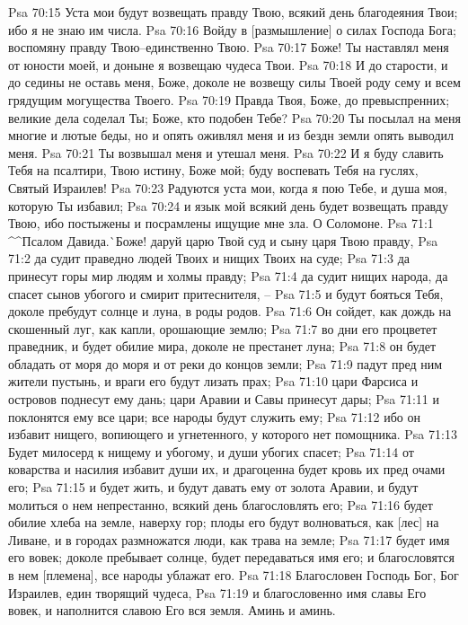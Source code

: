 Psa 70:15  Уста мои будут возвещать правду Твою, всякий день благодеяния Твои; ибо я не знаю им числа.
Psa 70:16  Войду в [размышление] о силах Господа Бога; воспомяну правду Твою--единственно Твою.
Psa 70:17  Боже! Ты наставлял меня от юности моей, и доныне я возвещаю чудеса Твои.
Psa 70:18  И до старости, и до седины не оставь меня, Боже, доколе не возвещу силы Твоей роду сему и всем грядущим могущества Твоего.
Psa 70:19  Правда Твоя, Боже, до превыспренних; великие дела соделал Ты; Боже, кто подобен Тебе?
Psa 70:20  Ты посылал на меня многие и лютые беды, но и опять оживлял меня и из бездн земли опять выводил меня.
Psa 70:21  Ты возвышал меня и утешал меня.
Psa 70:22  И я буду славить Тебя на псалтири, Твою истину, Боже мой; буду воспевать Тебя на гуслях, Святый Израилев!
Psa 70:23  Радуются уста мои, когда я пою Тебе, и душа моя, которую Ты избавил;
Psa 70:24  и язык мой всякий день будет возвещать правду Твою, ибо постыжены и посрамлены ищущие мне зла. О Соломоне.
Psa 71:1  ^^Псалом Давида.^^ Боже! даруй царю Твой суд и сыну царя Твою правду,
Psa 71:2  да судит праведно людей Твоих и нищих Твоих на суде;
Psa 71:3  да принесут горы мир людям и холмы правду;
Psa 71:4  да судит нищих народа, да спасет сынов убогого и смирит притеснителя, --
Psa 71:5  и будут бояться Тебя, доколе пребудут солнце и луна, в роды родов.
Psa 71:6  Он сойдет, как дождь на скошенный луг, как капли, орошающие землю;
Psa 71:7  во дни его процветет праведник, и будет обилие мира, доколе не престанет луна;
Psa 71:8  он будет обладать от моря до моря и от реки до концов земли;
Psa 71:9  падут пред ним жители пустынь, и враги его будут лизать прах;
Psa 71:10  цари Фарсиса и островов поднесут ему дань; цари Аравии и Савы принесут дары;
Psa 71:11  и поклонятся ему все цари; все народы будут служить ему;
Psa 71:12  ибо он избавит нищего, вопиющего и угнетенного, у которого нет помощника.
Psa 71:13  Будет милосерд к нищему и убогому, и души убогих спасет;
Psa 71:14  от коварства и насилия избавит души их, и драгоценна будет кровь их пред очами его;
Psa 71:15  и будет жить, и будут давать ему от золота Аравии, и будут молиться о нем непрестанно, всякий день благословлять его;
Psa 71:16  будет обилие хлеба на земле, наверху гор; плоды его будут волноваться, как [лес] на Ливане, и в городах размножатся люди, как трава на земле;
Psa 71:17  будет имя его вовек; доколе пребывает солнце, будет передаваться имя его; и благословятся в нем [племена], все народы ублажат его.
Psa 71:18  Благословен Господь Бог, Бог Израилев, един творящий чудеса,
Psa 71:19  и благословенно имя славы Его вовек, и наполнится славою Его вся земля. Аминь и аминь.

